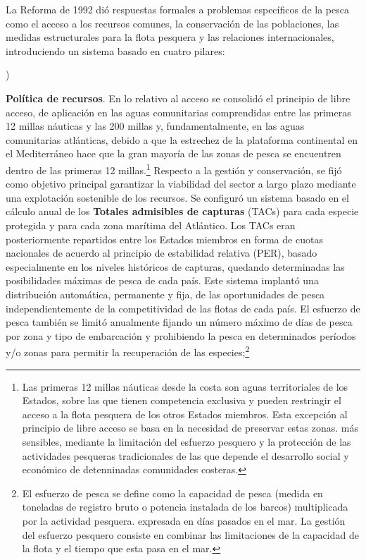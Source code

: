\documentclass[10pt,a4paper]{article}
\newcounter{alphaitem}
\newenvironment{la}
      {\begin{list}{\alph{alphaitem})}{%
          \usecounter{alphaitem}%
          \setlength{\leftmargin}{1cm}%
          \setlength{\parskip}{3pt}%
          \setlength{\itemsep}{0pt}%
          \setlength{\parsep}{0pt}%
      }}
      {\end{list}}
\begin{document}
La Reforma de 1992 dió respuestas formales a problemas específicos de la pesca como el acceso a los recursos comunes, la conservación de las poblaciones, las medidas estructurales para la flota pesquera y las relaciones internacionales, introduciendo un sistema basado en cuatro pilares:
\begin{la}
    \item \textbf{Política de recursos}. En lo relativo al acceso se consolidó el principio de libre acceso, de aplicación en las aguas comunitarias comprendidas entre las primeras 12 millas náuticas y las 200 millas y, fundamentalmente, en las aguas comunitarias atlánticas, debido a que la estrechez de la plataforma continental en el Mediterráneo hace que la gran mayoría de las zonas de pesca se encuentren dentro de las primeras 12 millas.\footnote{%
        Las primeras 12 millas náuticas desde la costa son aguas territoriales de los Estados, sobre las que tienen competencia exclusiva y pueden restringir el acceso a la flota pesquera de los otros Estados miembros. Esta excepción al principio de libre acceso se basa en la necesidad de preservar estas zonas. más sensibles, mediante la limitación del esfuerzo pesquero y la protección de las actividades pesqueras tradicionales de las que depende el desarrollo social y económico de detenninadas comunidades costeras.
    } Respecto a la gestión y conservación, se fijó como objetivo principal garantizar la viabilidad del sector a largo plazo mediante una explotación sostenible de los recursos. Se configuró un sistema basado en el cálculo anual de los \textbf{Totales admisibles de capturas} (TACs) para cada especie protegida y para cada zona marítima del Atlántico. Los TACs eran posteriormente repartidos entre los Estados miembros en forma de cuotas nacionales de acuerdo al principio de estabilidad relativa (PER), basado especialmente en los niveles históricos de capturas, quedando determinadas las posibilidades máximas de pesca de cada país. Este sistema implantó una distribución automática, permanente y fija, de las oportunidades de pesca independientemente de la competitividad de las flotas de cada país. El esfuerzo de pesca también se limitó anualmente fijando un número máximo de días de pesca por zona y tipo de embarcación y prohibiendo la pesca en determinados períodos y/o zonas para permitir la recuperación de las especies;\footnote{%
        El esfuerzo de pesca se define como la capacidad de pesca (medida en toneladas de registro bruto o potencia instalada de los barcos) multiplicada por la actividad pesquera. expresada en días pasados en el mar. La gestión del esfuerzo pesquero consiste en combinar las limitaciones de la capacidad de la flota y el tiempo que esta pasa en el mar.
}
\end{la}
\end{document}
